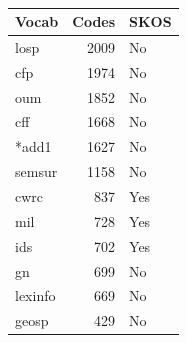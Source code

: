 \begin{table}[h]
\begin{tabular}{|l|r|l|}
\end{tabular}
\,
\begin{tabular}{|l|r|l|}
\hline
\textbf{Vocab} & \textbf{Codes} & \textbf{SKOS} \\ \hline
losp           & 2009 & No  \\ \hline
cfp            & 1974 & No  \\ \hline
oum            & 1852 & No  \\ \hline
cff            & 1668 & No  \\ \hline
*add1          & 1627 & No  \\ \hline
semsur         & 1158 & No  \\ \hline
cwrc           & 837  & Yes \\ \hline
mil            & 728  & Yes \\ \hline
ids            & 702  & Yes \\ \hline
gn             & 699  & No  \\ \hline
lexinfo        & 669  & No  \\ \hline
geosp          & 429  & No  \\ \hline

\end{tabular}
\end{table}
